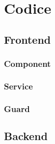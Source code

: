 
\chapter{Codice}

\section{Frontend}

\subsection{Component}

\subsection{Service}

\subsection{Guard}

\section{Backend}